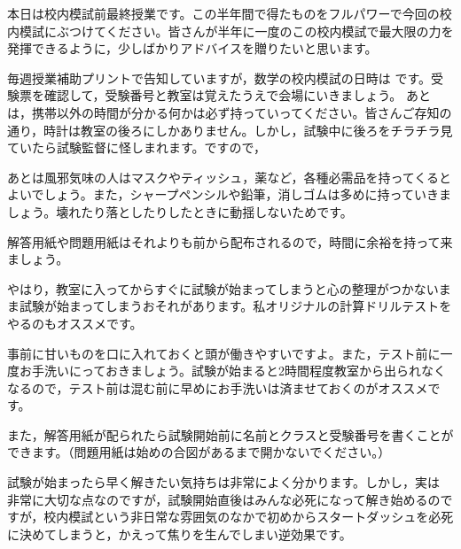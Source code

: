 \documentclass[b5j,7.5pt,twoside,twocolumn]{tetsujsarticle}
\begin{document}
\setcounter{回番号}{1}
\renewcommand{\回タイトル}{極限⑴}

本日は校内模試前最終授業です。この半年間で得たものをフルパワーで今回の校内模試にぶつけてください。皆さんが半年に一度のこの校内模試で最大限の力を発揮できるように，少しばかりアドバイスを贈りたいと思います。


毎週授業補助プリントで告知していますが，数学の校内模試の日時は
です。受験票を確認して，受験番号と教室は覚えたうえで会場にいきましょう。
あとは，携帯以外の時間が分かる何かは必ず持っていってください。皆さんご存知の通り，時計は教室の後ろにしかありません。しかし，試験中に後ろをチラチラ見ていたら試験監督に怪しまれます。ですので，

あとは風邪気味の人はマスクやティッシュ，薬など，各種必需品を持ってくるとよいでしょう。また，シャープペンシルや鉛筆，消しゴムは多めに持っていきましょう。壊れたり落としたりしたときに動揺しないためです。




解答用紙や問題用紙はそれよりも前から配布されるので，時間に余裕を持って来ましょう。


やはり，教室に入ってからすぐに試験が始まってしまうと心の整理がつかないまま試験が始まってしまうおそれがあります。私オリジナルの計算ドリルテストをやるのもオススメです。

事前に甘いものを口に入れておくと頭が働きやすいですよ。また，テスト前に一度お手洗いにっておきましょう。試験が始まると2時間程度教室から出られなくなるので，テスト前は混む前に早めにお手洗いは済ませておくのがオススメです。

また，解答用紙が配られたら試験開始前に名前とクラスと受験番号を書くことができます。（問題用紙は始めの合図があるまで開かないでください。）%




試験が始まったら早く解きたい気持ちは非常によく分かります。しかし，実は
非常に大切な点なのですが，試験開始直後はみんな必死になって解き始めるのですが，校内模試という非日常な雰囲気のなかで初めからスタートダッシュを必死に決めてしまうと，かえって焦りを生んでしまい逆効果です。
\end{document}
